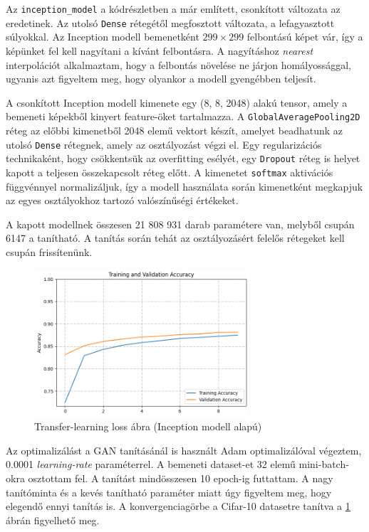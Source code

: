 Az \texttt{inception\_model} a kódrészletben a már említett, csonkított változata az eredetinek. Az utolsó \texttt{Dense} rétegétől megfosztott változata, a lefagyasztott súlyokkal. Az Inception modell bemenetként $299 \times 299$ felbontású képet vár, így a képünket fel kell nagyítani a kívánt felbontásra. A nagyításhoz \textit{nearest} interpolációt alkalmaztam, hogy a felbontás növelése ne járjon homályossággal, ugyanis azt figyeltem meg, hogy olyankor a modell gyengébben teljesít.

A csonkított Inception modell kimenete egy (8, 8, 2048) alakú tensor, amely a bemeneti képekből kinyert feature-öket tartalmazza. A \texttt{GlobalAveragePooling2D} réteg az előbbi kimenetből 2048 elemű vektort készít, amelyet beadhatunk az utolsó \texttt{Dense} rétegnek, amely az osztályozást végzi el. Egy regularizációs technikaként, hogy csökkentsük az overfitting esélyét, egy \texttt{Dropout} réteg is helyet kapott a teljesen összekapcsolt réteg előtt.
A kimenetet \texttt{softmax} aktivációs függvénnyel normalizáljuk, így a modell használata során kimenetként megkapjuk az egyes osztályokhoz tartozó valószínűségi értékeket.

A kapott modellnek összesen 21 808 931 darab paramétere van, melyből csupán 6147 a tanítható. A tanítás során tehát az osztályozásért felelős rétegeket kell csupán frissítenünk.

\begin{figure}[h]
	\centering
	\includegraphics[width=8cm]{images/transfer_inception.png}
	\caption{Transfer-learning loss ábra (Inception modell alapú)}
	\label{fig:transfer_learning_loss}
\end{figure}

Az optimalizálást a GAN tanításánál is használt Adam optimalizálóval végeztem, 0.0001 \textit{learning-rate} paraméterrel. A bemeneti dataset-et 32 elemű mini-batch-okra osztottam fel. A tanítást mindösszesen 10 epoch-ig futtattam. A nagy tanítóminta és a kevés tanítható paraméter miatt úgy figyeltem meg, hogy elegendő ennyi tanítás is. A konvergenciagörbe a Cifar-10 datasetre tanítva a \ref{fig:transfer_learning_loss} ábrán figyelhető meg.

